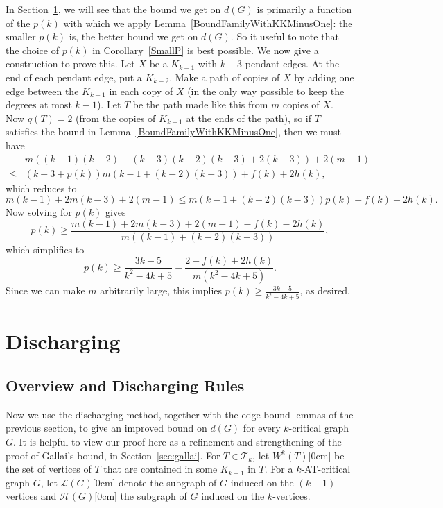 \documentclass[12pt]{article}
\theoremstyle{plain}
\theoremstyle{definition}
\theoremstyle{remark}
\newcommand{\fancy}[1]{\mathcal{#1}}
\newcommand{\T}{\fancy{T}}
\renewcommand{\L}{\fancy{L}}
\newcommand{\HH}{\fancy{H}}
\newcommand{\aside}[1]{\marginnote{\scriptsize{#1}}[0cm]}
\begin{document}
In Section~\ref{discharging}, we will see that the bound we get on $d(G)$ is
primarily a function of the $p(k)$ with which we apply
Lemma~\ref{BoundFamilyWithKKMinusOne}: the smaller $p(k)$ is, the better bound
we get on $d(G)$.  So it useful to note that the choice of $p(k)$ in
Corollary~\ref{SmallP} is best possible.  We now give a construction to prove
this.  Let $X$ be a $K_{k-1}$ with $k-3$ pendant edges.  At the end of each
pendant edge, put a $K_{k-2}$.  Make a path of copies of $X$ by adding one edge
between the $K_{k-1}$ in each copy of $X$ (in the only way possible to keep the
degrees at most $k-1$).  Let $T$ be the path made like this from $m$ copies of
$X$.  Now $q(T) = 2$ (from the copies of $K_{k-1}$ at the ends of the path), so
if $T$ satisfies the bound in Lemma~\ref{BoundFamilyWithKKMinusOne}, then we
must have
\begin{align*}
&m((k-1)(k-2) + (k-3)(k-2)(k-3) + 2(k-3)) + 2(m-1) \\
\le &(k-3 + p(k))m(k-1+(k-2)(k-3)) + f(k) + 2h(k),
\end{align*}
which reduces to
\[m(k-1) + 2m(k-3) + 2(m-1) \le m(k-1+(k-2)(k-3))p(k) + f(k) + 2h(k).\]
Now solving for $p(k)$ gives
\[p(k) \ge \frac{m(k-1)+2m(k-3)+2(m-1)-f(k)-2h(k)}{m((k-1)+(k-2)(k-3))},\] 
which simplifies to
\[p(k) \ge \frac{3k - 5}{k^2 - 4k + 5}-\frac{2+f(k)+2h(k)}{m(k^2-4k+5)}.\]
Since we can make $m$ arbitrarily large, this implies $p(k)\ge \frac{3k-5}{k^2-4k+5}$, as desired.

\section{Discharging}\label{discharging}

\subsection{Overview and Discharging Rules}
\label{discharging-overview}

Now we use the discharging method, together with the edge bound lemmas of the
previous section, to give an improved bound on $d(G)$ for every $k$-critical
graph $G$.  It is helpful to view our proof here as a refinement and
strengthening of the proof of Gallai's bound, in Section~\ref{sec:gallai}.  For
$T \in \T_k$, let $W^k(T)$\aside{$W^k(T)$} be the set of vertices of $T$ that
are contained in some $K_{k-1}$ in $T$.  For a $k$-AT-critical graph $G$, let
$\L(G)$\aside{$\L(G)$} denote the subgraph of $G$ induced on the
$(k-1)$-vertices and $\HH(G)$\aside{$\HH(G)$} the subgraph of $G$ induced on
the $k$-vertices.     
\end{document}
